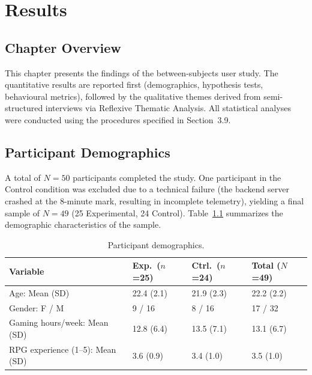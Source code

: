 \chapter{Results}

\section{Chapter Overview}

This chapter presents the findings of the between-subjects user study. The quantitative results are reported first (demographics, hypothesis tests, behavioural metrics), followed by the qualitative themes derived from semi-structured interviews via Reflexive Thematic Analysis. All statistical analyses were conducted using the procedures specified in Section~3.9.

\section{Participant Demographics}

A total of $N = 50$ participants completed the study. One participant in the Control condition was excluded due to a technical failure (the backend server crashed at the 8-minute mark, resulting in incomplete telemetry), yielding a final sample of $N = 49$ (25 Experimental, 24 Control). Table~\ref{tab:demographics} summarizes the demographic characteristics of the sample.

\begin{table}[H]
\centering
\caption{Participant demographics.}
\label{tab:demographics}
\small
\begin{tabular}{@{}llll@{}}
\toprule
\textbf{Variable} & \textbf{Exp.\ ($n$=25)} & \textbf{Ctrl.\ ($n$=24)} & \textbf{Total ($N$=49)} \\
\midrule
Age: Mean (SD) & 22.4 (2.1) & 21.9 (2.3) & 22.2 (2.2) \\
Gender: F / M & 9 / 16 & 8 / 16 & 17 / 32 \\
Gaming hours/week: Mean (SD) & 12.8 (6.4) & 13.5 (7.1) & 13.1 (6.7) \\
RPG experience (1--5): Mean (SD) & 3.6 (0.9) & 3.4 (1.0) & 3.5 (1.0) \\
\bottomrule
\end{tabular}
\end{table}

